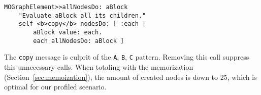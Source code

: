 \documentclass[10pt, conference, compsocconf]{IEEEtran}
\newcommand{\ct}{\lstinline[backgroundcolor=\color{white},basicstyle=\footnotesize\ttfamily]}
\newcommand{\ab}[1]{\nb{Alexandre}{blue}{#1}}
\newcommand{\figref}[1]{Figure~\ref{fig:#1}}
\newcommand{\secref}[1]{Section~\ref{sec:#1}}
\begin{document}
\begin{lstlisting}[]
MOGraphElement>>allNodesDo: aBlock
	"Evaluate aBlock all its children."
	self <b>copy</b> nodesDo: [ :each |
		aBlock value: each.
		each allNodesDo: aBlock ]
\end{lstlisting} 

The \ct{copy} message is culprit of the \ct{A}, \ct{B}, \ct{C} pattern. Removing this call suppress this unnecessary calls. When totaling with the memorization (\secref{memoization}), the amount of created nodes is down to 25, which is optimal for our profiled scenario.


%
%
%
%
%
%
\end{document}
